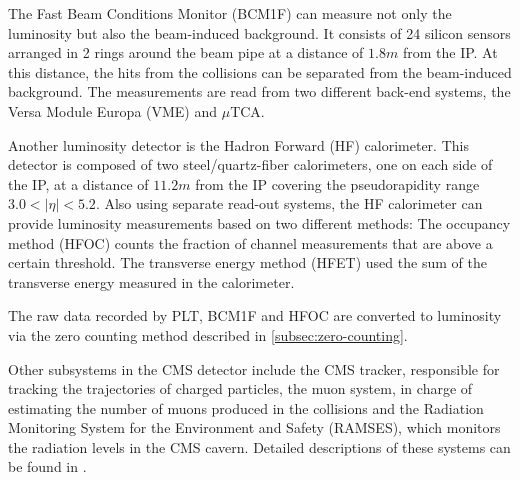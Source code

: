 The Fast Beam Conditions Monitor (BCM1F) \cite{CMS-DP-2022-033} can measure not only the luminosity but also the beam-induced background. It consists of 24 silicon sensors arranged in 2 rings around the beam pipe at a distance of $1.8m$ from the IP. At this distance, the hits from the collisions can be separated from the beam-induced background. The measurements are read from two different back-end systems, the Versa Module Europa (VME)  and $\mu$TCA.

Another luminosity detector is the Hadron Forward (HF) calorimeter. This detector is composed of two steel/quartz-fiber calorimeters, one on each side of the IP, at a distance of $11.2m$ from the IP covering the pseudorapidity range $3.0 < |\eta| < 5.2$. Also using separate read-out systems, the HF calorimeter can provide luminosity measurements based on two different methods: The occupancy method (HFOC) \cite{Sirunyan:2759951} counts the fraction of channel measurements that are above a certain threshold. The transverse energy method (HFET) used the sum of the transverse energy measured in the calorimeter.

The raw data recorded by PLT, BCM1F and HFOC are converted to luminosity via the zero counting method described in \autoref{subsec:zero-counting}.

Other subsystems in the CMS detector include the CMS tracker, responsible for tracking the trajectories of charged particles, the muon system, in charge of estimating the number of muons produced in the collisions and the Radiation Monitoring System for the Environment and Safety (RAMSES), which monitors the radiation levels in the CMS cavern. Detailed descriptions of these systems can be found in \cite{TheCMSCollaboration_2008}.
